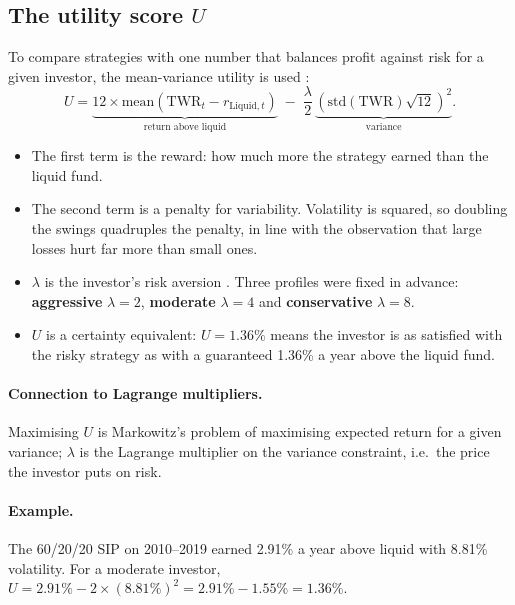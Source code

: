 \subsection{The utility score $U$}
\label{sec:utility}

To compare strategies with one number that balances profit against risk for a given investor, the
mean-variance utility is used \citep{markowitz1952,levy1979,bkm2021}:
\begin{equation}
  U = \underbrace{12 \times \text{mean}(\text{TWR}_t - r_{\text{Liquid},t})}_{\text{return above liquid}}
      \; - \; \frac{\lambda}{2}\,\underbrace{\left(\text{std}(\text{TWR}) \sqrt{12}\right)^2}_{\text{variance}} .
  \label{eq:U}
\end{equation}

\begin{itemize}
  \item The first term is the reward: how much more the strategy earned than the liquid fund.
  \item The second term is a penalty for variability. Volatility is squared, so doubling the swings
        quadruples the penalty, in line with the observation that large losses hurt far more than
        small ones.
  \item $\lambda$ is the investor's risk aversion \citep{pratt1964}. Three profiles were fixed in
        advance: \textbf{aggressive} $\lambda=2$, \textbf{moderate} $\lambda=4$ and
        \textbf{conservative} $\lambda=8$.
  \item $U$ is a certainty equivalent: $U = 1.36\%$ means the investor is as satisfied with the
        risky strategy as with a guaranteed 1.36\% a year above the liquid fund.
\end{itemize}

\paragraph{Connection to Lagrange multipliers.} Maximising $U$ is Markowitz's problem of maximising expected return for a given variance; $\lambda$ is the Lagrange multiplier on the variance constraint, i.e.\ the price the investor puts on risk.

\paragraph{Example.} The 60/20/20 SIP on 2010--2019 earned 2.91\% a year above liquid with 8.81\%
volatility. For a moderate investor, $U = 2.91\% - 2 \times (8.81\%)^2 = 2.91\% - 1.55\% = 1.36\%$.

